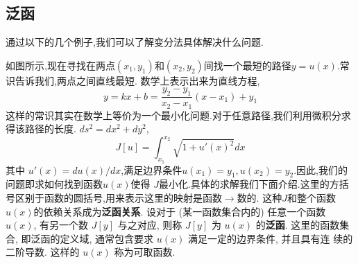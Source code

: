 \subsection{泛函}
\label{subsec:functional}
通过以下的几个例子,我们可以了解变分法具体解决什么问题.

如图所示,现在寻找在两点$(x_1, y_1)$和$(x_2,y_2)$间找一个最短的路径$y=u(x)$.常识告诉我们,两点之间直线最短.
数学上表示出来为直线方程,
\[
  y = k x + b = \frac{y_2 - y_1}{x_2 - x_1} ( x - x_1) + y_1  
\]
这样的常识其实在数学上等价为一个最小化问题.对于任意路径,我们利用微积分求得该路径的长度.
$ds^2 = dx^2 + dy^2$,
\[
J[u] = \int_{x_1}^{x_2} \sqrt{ 1 + u'(x)^2} dx    
\]
其中 $u'(x) = du(x)/dx$,满足边界条件$u(x_1) = y_1, u(x_2) = y_2$.因此,我们的问题即求如何找到函数$u(x)$使得
$J$最小化.具体的求解我们下面介绍.这里的方括号区别于函数的圆括号,用来表示这里的映射是函数$\to$数的.
这种$J$和整个函数$u(x)$的依赖关系成为\textbf{泛函关系}.
设对于 (某一函数集合内的) 任意一个函数 $u(x)$, 
有另一个数 $J[y]$ 与之对应, 则称 $J[y]$ 为 $u(x)$ 的\textbf{泛函}. 
这里的函数集合, 即泛函的定义域, 通常包含要求 $u(x)$ 满足一定的边界条件,
并且具有连 续的二阶导数. 这样的 $u(x)$ 称为可取函数. 


